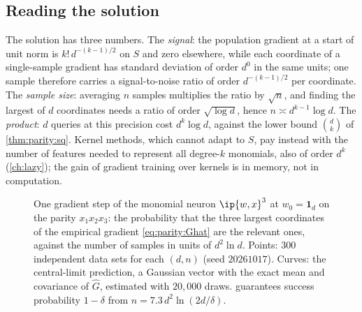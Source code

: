 \begin{refsection}
\section{Reading the solution}\label{sec:parity:reading}

The solution has three numbers. The \emph{signal}: the population gradient at a start of unit norm is $k!\,d^{-(k-1)/2}$ on $S$ and zero elsewhere, while each coordinate of a single-sample gradient has standard deviation of order $d^0$ in the same units; one sample therefore carries a signal-to-noise ratio of order $d^{-(k-1)/2}$ per coordinate. The \emph{sample size}: averaging $n$ samples multiplies the ratio by $\sqrt n$, and finding the largest of $d$ coordinates needs a ratio of order $\sqrt{\log d}$, hence $n\asymp d^{k-1}\log d$. The \emph{product}: $d$ queries at this precision cost $d^k\log d$, against the lower bound $\binom dk$ of \cref{thm:parity:sq}. Kernel methods, which cannot adapt to $S$, pay instead with the number of features needed to represent all degree-$k$ monomials, also of order $d^k$ (\cref{ch:lazy}); the gain of gradient training over kernels is in memory, not in computation.

\begin{figure}[t]
\centering
{}
\caption{One gradient step of the monomial neuron $\ip{w,x}^3$ at $w_0=\mathbf 1_d$ on the parity $x_1x_2x_3$: the probability that the three largest coordinates of the empirical gradient \eqref{eq:parity:Ghat} are the relevant ones, against the number of samples in units of $d^2\ln d$. Points: $300$ independent data sets for each $(d,n)$ (seed $20261017$). Curves: the central-limit prediction, a Gaussian vector with the exact mean and covariance of $\hat G$, estimated with $20{,}000$ draws.  guarantees success probability $1-\delta$ from $n=7.3\,d^2\ln(2d/\delta)$.}\label{fig:parity:onestep}
\end{figure}


\end{refsection}
